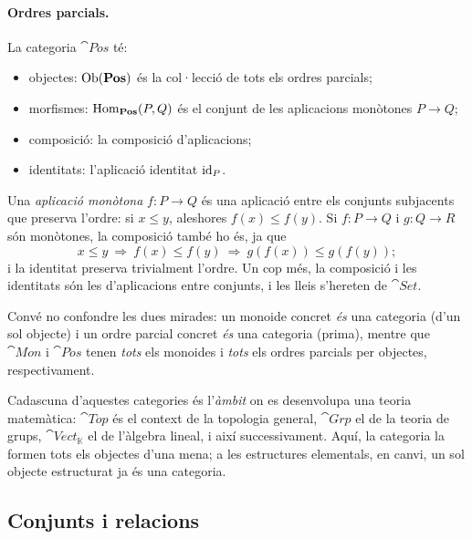 \paragraph{Ordres parcials.}
La categoria $\cat{Pos}$ té:
\begin{itemize}
\item objectes: $\operatorname{Ob}(\mathbf{Pos})$ és la col·lecció de tots els ordres parcials;
\item morfismes: $\operatorname{Hom}_{\mathbf{Pos}}(P,Q)$ és el conjunt de les aplicacions monòtones $P\to Q$;
\item composició: la composició d'aplicacions;
\item identitats: l'aplicació identitat $\operatorname{id}_{P}$.
\end{itemize}
Una \emph{aplicació monòtona} $f\colon P\to Q$ és una aplicació entre els conjunts subjacents que preserva l'ordre: si $x\le y$, aleshores $f(x)\le f(y)$. Si $f\colon P\to Q$ i $g\colon Q\to R$ són monòtones, la composició també ho és, ja que
\[
x\le y \ \Longrightarrow\ f(x)\le f(y) \ \Longrightarrow\ g(f(x))\le g(f(y));
\]
i la identitat preserva trivialment l'ordre. Un cop més, la composició i les identitats són les d'aplicacions entre conjunts, i les lleis s'hereten de $\cat{Set}$.

Convé no confondre les dues mirades: un monoide concret \emph{és} una categoria (d'un sol objecte) i un ordre parcial concret \emph{és} una categoria (prima), mentre que $\cat{Mon}$ i $\cat{Pos}$ tenen \emph{tots} els monoides i \emph{tots} els ordres parcials per objectes, respectivament.

\begin{observacio}
Cadascuna d'aquestes categories és l'\emph{àmbit} on es desenvolupa una teoria matemàtica: $\cat{Top}$ és el context de la topologia general, $\cat{Grp}$ el de la teoria de grups, $\cat{Vect}_{\mathbb K}$ el de l'àlgebra lineal, i així successivament. Aquí, la categoria la formen tots els objectes d'una mena; a les estructures elementals, en canvi, un sol objecte estructurat ja és una categoria.
\end{observacio}

\subsection{Conjunts i relacions}

